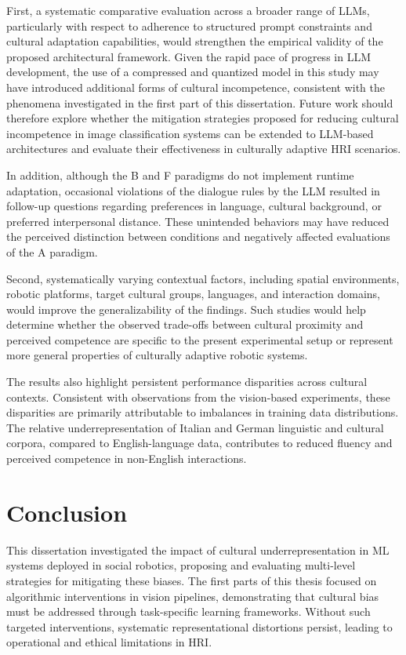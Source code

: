 First, a systematic comparative evaluation across a broader range of LLMs, particularly with respect to adherence to structured prompt constraints and cultural adaptation capabilities, would strengthen the empirical validity of the proposed architectural framework. Given the rapid pace of progress in LLM development, the use of a compressed and quantized model in this study may have introduced additional forms of cultural incompetence, consistent with the phenomena investigated in the first part of this dissertation. Future work should therefore explore whether the mitigation strategies proposed for reducing cultural incompetence in image classification systems can be extended to LLM-based architectures and evaluate their effectiveness in culturally adaptive HRI scenarios.

In addition, although the B and F paradigms do not implement runtime adaptation, occasional violations of the dialogue rules by the LLM resulted in follow-up questions regarding preferences in language, cultural background, or preferred interpersonal distance. These unintended behaviors may have reduced the perceived distinction between conditions and negatively affected evaluations of the A paradigm.

Second, systematically varying contextual factors, including spatial environments, robotic platforms, target cultural groups, languages, and interaction domains, would improve the generalizability of the findings. Such studies would help determine whether the observed trade-offs between cultural proximity and perceived competence are specific to the present experimental setup or represent more general properties of culturally adaptive robotic systems.

The results also highlight persistent performance disparities across cultural contexts. Consistent with observations from the vision-based experiments, these disparities are primarily attributable to imbalances in training data distributions. The relative underrepresentation of Italian and German linguistic and cultural corpora, compared to English-language data, contributes to reduced fluency and perceived competence in non-English interactions.

\section{Conclusion}

This dissertation investigated the impact of cultural underrepresentation in ML systems deployed in social robotics, proposing and evaluating multi-level strategies for mitigating these biases. The first parts of this thesis focused on algorithmic interventions in vision pipelines, demonstrating that cultural bias must be addressed through task-specific learning frameworks. Without such targeted interventions, systematic representational distortions persist, leading to operational and ethical limitations in HRI.

